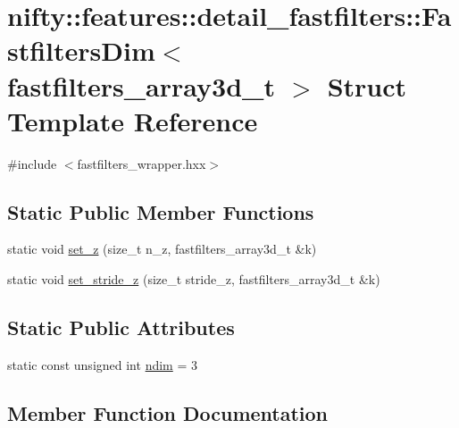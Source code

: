 \hypertarget{structnifty_1_1features_1_1detail__fastfilters_1_1FastfiltersDim_3_01fastfilters__array3d__t_01_4}{}\section{nifty\+:\+:features\+:\+:detail\+\_\+fastfilters\+:\+:Fastfilters\+Dim$<$ fastfilters\+\_\+array3d\+\_\+t $>$ Struct Template Reference}
\label{structnifty_1_1features_1_1detail__fastfilters_1_1FastfiltersDim_3_01fastfilters__array3d__t_01_4}


{\ttfamily \#include $<$fastfilters\+\_\+wrapper.\+hxx$>$}

\subsection*{Static Public Member Functions}
\begin{DoxyCompactItemize}
\item 
static void \hyperlink{structnifty_1_1features_1_1detail__fastfilters_1_1FastfiltersDim_3_01fastfilters__array3d__t_01_4_a6e88b081aa0233e81f3a8c84c3ef53b8}{set\+\_\+z} (size\+\_\+t n\+\_\+z, fastfilters\+\_\+array3d\+\_\+t \&k)
\item 
static void \hyperlink{structnifty_1_1features_1_1detail__fastfilters_1_1FastfiltersDim_3_01fastfilters__array3d__t_01_4_a0698c3079abd3fc3259201d569226a45}{set\+\_\+stride\+\_\+z} (size\+\_\+t stride\+\_\+z, fastfilters\+\_\+array3d\+\_\+t \&k)
\end{DoxyCompactItemize}
\subsection*{Static Public Attributes}
\begin{DoxyCompactItemize}
\item 
static const unsigned int \hyperlink{structnifty_1_1features_1_1detail__fastfilters_1_1FastfiltersDim_3_01fastfilters__array3d__t_01_4_ade1a9611314dfe152d2cab3cab55e473}{ndim} = 3
\end{DoxyCompactItemize}


\subsection{Member Function Documentation}
\hypertarget{structnifty_1_1features_1_1detail__fastfilters_1_1FastfiltersDim_3_01fastfilters__array3d__t_01_4_a0698c3079abd3fc3259201d569226a45}{}
